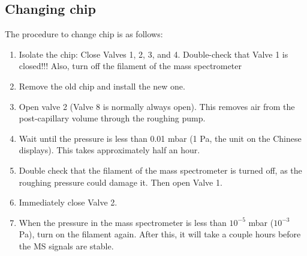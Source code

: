 \subsection{Changing chip}
The procedure to change chip is as follows:
\begin{enumerate}
	\item Isolate the chip: Close Valves 1, 2, 3, and 4. Double-check that Valve 1 is closed!!! Also, turn off the filament of the mass spectrometer
	
	\item Remove the old chip and install the new one.
	
	\item Open valve 2 (Valve 8 is normally always open). This removes air from the post-capillary volume through the roughing pump.
	
	\item Wait until the pressure is less than 0.01 mbar (1 Pa, the unit on the Chinese displays). This takes approximately half an hour.
	
	\item Double check that the filament of the mass spectrometer is turned off, as the roughing pressure could damage it. Then open Valve 1. 
	
	\item Immediately close Valve 2.
	
	\item When the pressure in the mass spectrometer is less than $10^{-5}$ mbar ($10^{-3}$ Pa), turn on the filament again. After this, it will take a couple hours before the MS signals are stable.	
\end{enumerate}



